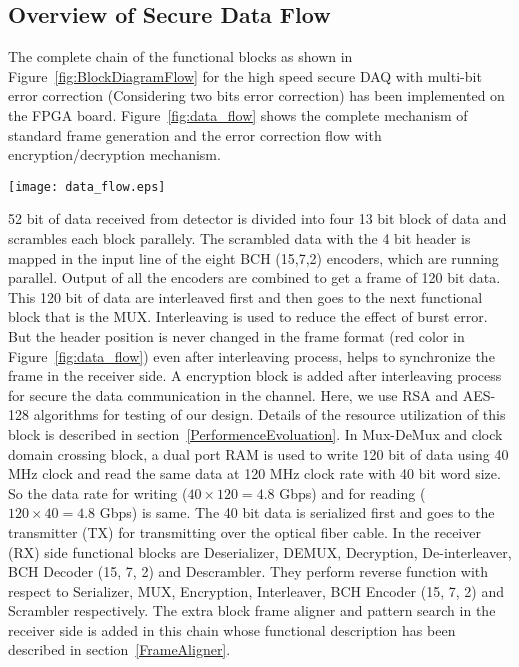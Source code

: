 \documentclass[a4paper]{jpconf}
\begin{document}
\subsection{Overview of Secure Data Flow }
 The complete chain of the functional blocks as shown in Figure~\ref{fig:BlockDiagramFlow} for the high speed secure DAQ with multi-bit error correction (Considering two bits error correction) has been implemented on the FPGA board. Figure~\ref{fig:data_flow} shows the complete mechanism of standard frame generation and the error correction flow with encryption/decryption mechanism.
\begin{figure*}[htb]
\hspace{-3 pc}
\texttt{[image: data\_flow.eps]}
\vspace{-10 pt}
\caption{Standard frame generation and Error correction flow with encryption/decryption}
\label{fig:data_flow}
\vspace{-15 pt}
\end{figure*}

52 bit of data received from detector is divided into four 13 bit block of data and scrambles each block parallely. The scrambled data with the 4 bit header is mapped in the input line of the eight BCH (15,7,2) encoders, which are running parallel.  Output of all the encoders are combined to get a frame of 120 bit data. This 120 bit of data are interleaved first and then goes to the next functional block that is the MUX. Interleaving is used to reduce the effect of burst error. But the header position is never changed in the frame format (red color in Figure~\ref{fig:data_flow}) even after interleaving process, helps to synchronize the frame in the receiver side. A encryption block is added after interleaving process for secure the data communication in the channel. Here, we use RSA and AES-128 algorithms for testing of our design. Details of the resource utilization of this block is described in section~\ref{PerformenceEvoluation}. In Mux-DeMux and clock domain crossing block, a dual port RAM is used to write 120 bit of data using 40 MHz clock and read the same data at 120 MHz clock rate with 40 bit word size. So the data rate for writing ($40 \times 120=4.8 $ Gbps) and for reading ($120\times 40=4.8$ Gbps) is same. The 40 bit data is serialized first and goes to the transmitter (TX) for transmitting over the optical fiber cable. In the receiver (RX) side functional blocks are Deserializer, DEMUX, Decryption, De-interleaver, BCH Decoder (15, 7, 2) and Descrambler. They perform reverse function with respect to Serializer, MUX, Encryption, Interleaver, BCH Encoder (15, 7, 2) and Scrambler respectively. The extra block frame aligner and pattern search in the receiver side is added in this chain whose functional description has been described in section~\ref{FrameAligner}.
\end{document}
